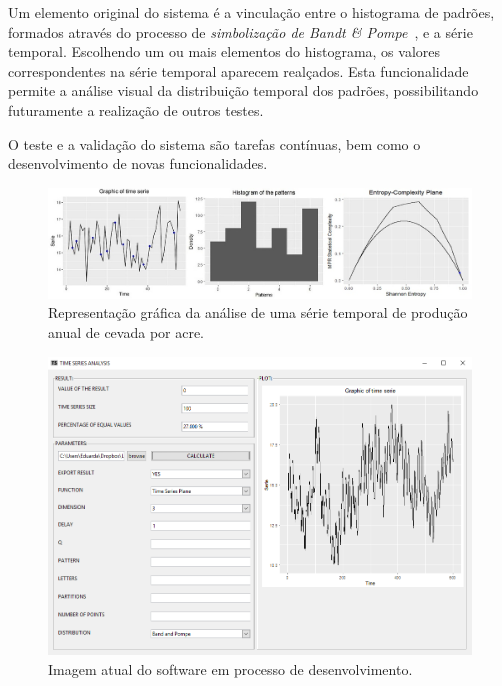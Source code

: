 \documentclass[12pt,letterpaper]{article}
\begin{document}
Um elemento original do sistema é a vinculação entre o histograma de padrões, formados através do processo de \textit{simbolização de Bandt \& Pompe}~\cite{PermutationEntropyBandtPompe}, e a série temporal. Escolhendo um ou mais elementos do histograma, os valores correspondentes na série temporal aparecem realçados. Esta funcionalidade permite a análise visual da distribuição temporal dos padrões, possibilitando futuramente a realização de outros testes.
 
 O teste e a validação do sistema são tarefas contínuas, bem como o desenvolvimento de novas funcionalidades. 
  
\begin{figure}[H]
	\centering
	\includegraphics[width=1\columnwidth]{rplot}        
    \caption{Representação gráfica da análise de uma série temporal de produção anual de cevada por acre.}
\end{figure}
 
\begin{figure}[H]
	\centering
	\includegraphics[width=0.95\columnwidth]{TMS}   
    \caption{Imagem atual do software em processo de desenvolvimento.}
    \vspace{6cm}
\end{figure}

\end{document}

